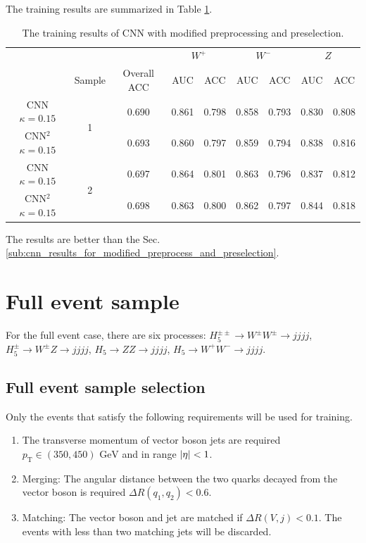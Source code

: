 \documentclass[12pt]{article}
\begin{document}
		The training results are summarized in Table \ref{tab:training_result_old}.
		\begin{table}[htpb]
			\centering
			\caption{The training results of CNN with modified preprocessing and preselection.}
			\label{tab:training_result_old}
			\begin{tabular}{c|c|c|cc|cc|cc}
										&					  &             & \multicolumn{2}{c|}{$W^{+}$} & \multicolumn{2}{c|}{$W^{-}$} & \multicolumn{2}{c}{$Z$} \\
										& Sample			  & Overall ACC & AUC        & ACC       & AUC        & ACC       & AUC       & ACC       \\ \hline
				CNN $\kappa=0.15$		& \multirow{2}{*}{1}  & 0.690 & 0.861 & 0.798 & 0.858 & 0.793 & 0.830 & 0.808 \\
				CNN${}^2$ $\kappa=0.15$ &					  & 0.693 & 0.860 & 0.797 & 0.859 & 0.794 & 0.838 & 0.816 \\ \hline
				CNN $\kappa=0.15$		& \multirow{2}{*}{2}  & 0.697 & 0.864 & 0.801 & 0.863 & 0.796 & 0.837 & 0.812 \\
				CNN${}^2$ $\kappa=0.15$ &					  & 0.698 & 0.863 & 0.800 & 0.862 & 0.797 & 0.844 & 0.818 \\ \hline
			\end{tabular}
		\end{table}
		The results are better than the Sec.\ref{sub:cnn_results_for_modified_preprocess_and_preselection}.

\section{Full event sample}%
\label{sec:full_event_sample}
	For the full event case, there are six processes: $H_5^{\pm\pm} \to W^{\pm}W^{\pm} \to jjjj$, $H_5^{\pm} \to W^{\pm}Z \to jjjj$, $H_5\to ZZ \to jjjj$, $H_5\to W^{+}W^{-} \to jjjj$.

	\subsection{Full event sample selection}%
	\label{sub:full_event_sample_selection}	
		Only the events that satisfy the following requirements will be used for training.
		\begin{enumerate}
			\item The transverse momentum of vector boson jets are required $p_\text{T} \in (350, 450) \text{ GeV}$ and in range $\abs{\eta}<1$.
			\item Merging: The angular distance between the two quarks decayed from the vector boson is required $\Delta R(q_1,q_2) < 0.6$.
			\item Matching: The vector boson and jet are matched if $\Delta R(V,j) < 0.1$. The events with less than two matching jets will be discarded.
		\end{enumerate}
	
\end{document}
